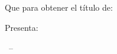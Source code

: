 \begin{titlepage}
\begin{center}
\begin{minipage}[c][0.99\textheight][t]{0.9\textwidth}
\begin{center}
       \vspace{2cm}

        \begingroup
            \spacedallcaps{\myUni} \\ \bigskip
        \endgroup
        
        \vfil
        
        \begingroup
            \spacedallcaps{\myFaculty} \\ \bigskip
        \endgroup

        \hfill

        \vfill
        
        \begingroup
            \color{CTtitle}\spacedallcaps{\myTitle} \\ \bigskip
        \endgroup

        \vfill
        \\[1.2cm]
        
        Que para obtener el título de: \\ \bigskip
        \myDegree

        \vspace{1.4cm}
        Presenta: \\ \bigskip
        \spacedlowsmallcaps{\myName}

        \vfill


      

        \myTime\ -- \myVersion

        \vfill

        \end{center}
\end{minipage}
\end{center}
\end{titlepage}